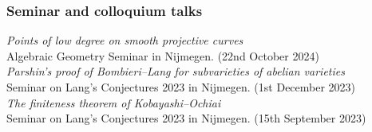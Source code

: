 \documentclass[paper=a4,fontsize=11pt,DIV=11,BCOR=3mm,pdftex]{scrartcl}
\begin{document}
\subsubsection*{Seminar and colloquium talks}

\textit{Points of low degree on smooth projective curves} \\
Algebraic Geometry Seminar in Nijmegen. (22nd October 2024) \\

\textit{Parshin's proof of Bombieri--Lang for subvarieties of abelian varieties} \\
Seminar on Lang's Conjectures 2023 in Nijmegen. (1st December 2023) \\

\textit{The finiteness theorem of Kobayashi--Ochiai} \\
Seminar on Lang's Conjectures 2023 in Nijmegen. (15th September 2023)
\end{document}
